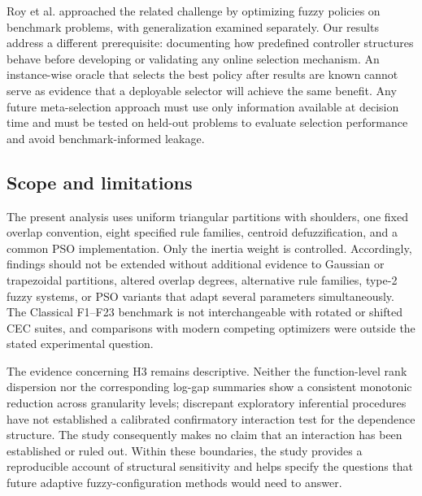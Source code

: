 Roy et al. \cite{Roy2024} approached the related challenge by optimizing fuzzy policies on benchmark problems, with generalization examined separately. Our results address a different prerequisite: documenting how predefined controller structures behave before developing or validating any online selection mechanism. An instance-wise oracle that selects the best policy after results are known cannot serve as evidence that a deployable selector will achieve the same benefit. Any future meta-selection approach must use only information available at decision time and must be tested on held-out problems to evaluate selection performance and avoid benchmark-informed leakage.

\subsection{Scope and limitations}
The present analysis uses uniform triangular partitions with shoulders, one fixed overlap convention, eight specified rule families, centroid defuzzification, and a common PSO implementation. Only the inertia weight is controlled. Accordingly, findings should not be extended without additional evidence to Gaussian or trapezoidal partitions, altered overlap degrees, alternative rule families, type-2 fuzzy systems, or PSO variants that adapt several parameters simultaneously. The Classical F1--F23 benchmark is not interchangeable with rotated or shifted CEC suites, and comparisons with modern competing optimizers were outside the stated experimental question.

The evidence concerning H3 remains descriptive. Neither the function-level rank dispersion nor the corresponding log-gap summaries show a consistent monotonic reduction across granularity levels; discrepant exploratory inferential procedures have not established a calibrated confirmatory interaction test for the dependence structure. The study consequently makes no claim that an interaction has been established or ruled out. Within these boundaries, the study provides a reproducible account of structural sensitivity and helps specify the questions that future adaptive fuzzy-configuration methods would need to answer.

